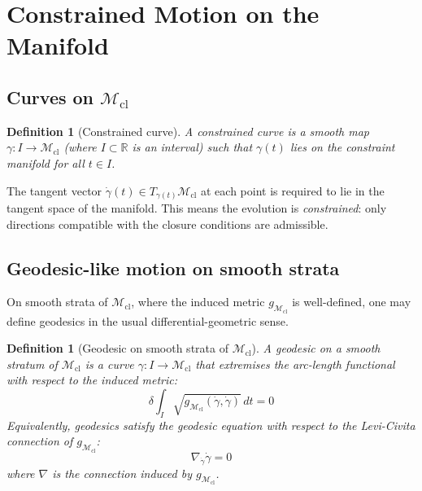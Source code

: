 \documentclass[12pt]{article}
\newtheorem{definition}[theorem]{Definition}
\newcommand{\Mcl}{\mathcal{M}_{\mathrm{cl}}}
\begin{document}
\section{Constrained Motion on the Manifold}\label{sec:motion}

\subsection{Curves on $\Mcl$}

\begin{definition}[Constrained curve]\label{def:curve}
A constrained curve is a smooth map $\gamma : I \to \Mcl$ (where $I \subset \mathbb{R}$ is an interval) such that $\gamma(t)$ lies on the constraint manifold for all $t \in I$.
\end{definition}

The tangent vector $\dot{\gamma}(t) \in T_{\gamma(t)} \Mcl$ at each point is required to lie in the tangent space of the manifold. This means the evolution is \textit{constrained}: only directions compatible with the closure conditions are admissible.

\subsection{Geodesic-like motion on smooth strata}

On smooth strata of $\Mcl$, where the induced metric $g_{\Mcl}$ is well-defined, one may define geodesics in the usual differential-geometric sense.

\begin{definition}[Geodesic on smooth strata of $\Mcl$]\label{def:geodesic}
A geodesic on a smooth stratum of $\Mcl$ is a curve $\gamma : I \to \Mcl$ that extremises the arc-length functional with respect to the induced metric:
\begin{equation}\label{eq:geodesic}
    \delta \int_I \sqrt{g_{\Mcl}(\dot{\gamma}, \dot{\gamma})}\, dt = 0
\end{equation}
Equivalently, geodesics satisfy the geodesic equation with respect to the Levi-Civita connection of $g_{\Mcl}$:
\begin{equation}\label{eq:geoeq}
    \nabla_{\dot{\gamma}} \dot{\gamma} = 0
\end{equation}
where $\nabla$ is the connection induced by $g_{\Mcl}$.
\end{definition}
\end{document}
